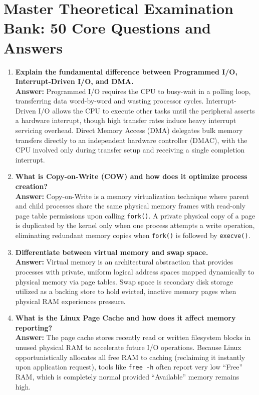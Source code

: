 \section{Master Theoretical Examination Bank: 50 Core Questions and Answers}
\label{sec:os_master_theory_bank}

\begin{enumerate}[label=\textbf{Q\arabic*.},leftmargin=1.2cm]
\item \textbf{Explain the fundamental difference between Programmed I/O, Interrupt-Driven I/O, and DMA.} \\
\textbf{Answer:} Programmed I/O requires the CPU to busy-wait in a polling loop, transferring data word-by-word and wasting processor cycles. Interrupt-Driven I/O allows the CPU to execute other tasks until the peripheral asserts a hardware interrupt, though high transfer rates induce heavy interrupt servicing overhead. Direct Memory Access (DMA) delegates bulk memory transfers directly to an independent hardware controller (DMAC), with the CPU involved only during transfer setup and receiving a single completion interrupt.

\item \textbf{What is Copy-on-Write (COW) and how does it optimize process creation?} \\
\textbf{Answer:} Copy-on-Write is a memory virtualization technique where parent and child processes share the same physical memory frames with read-only page table permissions upon calling \texttt{fork()}. A private physical copy of a page is duplicated by the kernel only when one process attempts a write operation, eliminating redundant memory copies when \texttt{fork()} is followed by \texttt{execve()}.

\item \textbf{Differentiate between virtual memory and swap space.} \\
\textbf{Answer:} Virtual memory is an architectural abstraction that provides processes with private, uniform logical address spaces mapped dynamically to physical memory via page tables. Swap space is secondary disk storage utilized as a backing store to hold evicted, inactive memory pages when physical RAM experiences pressure.

\item \textbf{What is the Linux Page Cache and how does it affect memory reporting?} \\
\textbf{Answer:} The page cache stores recently read or written filesystem blocks in unused physical RAM to accelerate future I/O operations. Because Linux opportunistically allocates all free RAM to caching (reclaiming it instantly upon application request), tools like \texttt{free -h} often report very low ``Free'' RAM, which is completely normal provided ``Available'' memory remains high.


\end{enumerate}
